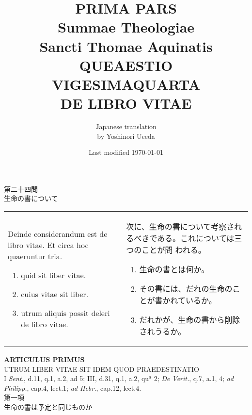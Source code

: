 \documentclass[10pt]{jsarticle} %
\title{{\bf PRIMA PARS}\\{\HUGE Summae Theologiae}\\Sancti Thomae
Aquinatis\\{\sffamily QUEAESTIO VIGESIMAQUARTA}\\DE LIBRO VITAE}
\author{Japanese translation\\by Yoshinori {\sc Ueeda}}
\date{Last modified \today}
\begin{document}
\maketitle
\pagestyle{fancy}


\begin{center}
{\Large 第二十四問\\生命の書について}
\end{center}


\begin{longtable}{p{21em}p{21em}}

Deinde considerandum est de libro vitae. Et circa hoc quaeruntur
 tria. 

\begin{enumerate}
 \item quid sit liber vitae.
 \item cuius vitae sit liber.
 \item utrum aliquis possit deleri de libro vitae.
\end{enumerate}

&

次に、生命の書について考察されるべきである。これについては三つのことが問
 われる。

\begin{enumerate}
 \item 生命の書とは何か。
 \item その書には、だれの生命のことが書かれているか。
 \item だれかが、生命の書から削除されうるか。
\end{enumerate}

\end{longtable}


\newpage


\begin{center}
 {\Large {\bf ARTICULUS PRIMUS}}\\
 {\large UTRUM LIBER VITAE SIT IDEM QUOD PRAEDESTINATIO}\\
 {\footnotesize I {\itshape Sent.}, d.11, q.1, a.2, ad 5; III, d.31,
 q.1, a.2, qu$^a$ 2;  {\itshape De Verit.}, q.7, a.1, 4; {\itshape ad
 Philipp.}, cap.4, lect.1; {\itshape ad Hebr.}, cap.12, lect.4.}\\
 {\Large 第一項\\生命の書は予定と同じものか}
\end{center}
\end{document}
